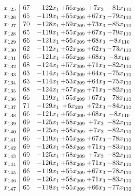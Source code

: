 \documentclass[11pt]{article}
\begin{document}
\[\begin{array}{c| c c@{\hskip 2pt} c@{\hskip 2pt} c@{\hskip 2pt} c@{\hskip 2pt} }
 x_{125}   &  67 & -122 x_{1} & + 56 x_{209} & + 7 x_{3} & -81 x_{110}\\
 x_{126}   &  65 & -119 x_{1} & + 55 x_{209} & + 67 x_{3} & -79 x_{110}\\
 x_{127}   &  70 & -128 x_{1} & + 59 x_{209} & + 73 x_{3} & -85 x_{110}\\
 x_{128}   &  65 & -119 x_{1} & + 55 x_{209} & + 67 x_{3} & -79 x_{110}\\
 x_{129}   &  66 & -121 x_{1} & + 56 x_{209} & + 68 x_{3} & -8 x_{110}\\
 x_{130}   &  62 & -112 x_{1} & + 52 x_{209} & + 62 x_{3} & -73 x_{110}\\
 x_{131}   &  66 & -121 x_{1} & + 56 x_{209} & + 68 x_{3} & -8 x_{110}\\
 x_{132}   &  68 & -124 x_{1} & + 57 x_{209} & + 71 x_{3} & -82 x_{110}\\
 x_{133}   &  63 & -114 x_{1} & + 53 x_{209} & + 64 x_{3} & -75 x_{110}\\
 x_{134}   &  63 & -114 x_{1} & + 53 x_{209} & + 64 x_{3} & -75 x_{110}\\
 x_{135}   &  68 & -124 x_{1} & + 57 x_{209} & + 71 x_{3} & -82 x_{110}\\
 x_{136}   &  66 & -119 x_{1} & + 55 x_{209} & + 67 x_{3} & -78 x_{110}\\
 x_{137}   &  71 & -129 x_{1} & + 6 x_{209} & + 72 x_{3} & -84 x_{110}\\
 x_{138}   &  66 & -121 x_{1} & + 56 x_{209} & + 68 x_{3} & -8 x_{110}\\
 x_{139}   &  69 & -125 x_{1} & + 58 x_{209} & + 7 x_{3} & -82 x_{110}\\
 x_{140}   &  69 & -125 x_{1} & + 58 x_{209} & + 7 x_{3} & -82 x_{110}\\
 x_{141}   &  66 & -119 x_{1} & + 55 x_{209} & + 67 x_{3} & -78 x_{110}\\
 x_{142}   &  69 & -126 x_{1} & + 58 x_{209} & + 71 x_{3} & -83 x_{110}\\
 x_{143}   &  69 & -125 x_{1} & + 58 x_{209} & + 7 x_{3} & -82 x_{110}\\
 x_{144}   &  69 & -126 x_{1} & + 58 x_{209} & + 71 x_{3} & -83 x_{110}\\
 x_{145}   &  66 & -119 x_{1} & + 55 x_{209} & + 67 x_{3} & -78 x_{110}\\
 x_{146}   &  69 & -126 x_{1} & + 58 x_{209} & + 71 x_{3} & -83 x_{110}\\
 x_{147}   &  65 & -118 x_{1} & + 55 x_{209} & + 66 x_{3} & -77 x_{110}\\

\end{array}\]
\end{document}

